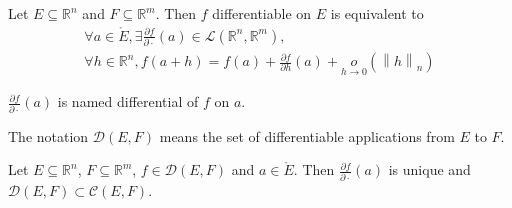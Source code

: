 \documentclass[11pt,en]{elegantpaper}
\newcommand{\norm}[1]{\left\lVert#1\right\rVert}
\newcommand{\Real}{\mathbb{R}}
\begin{document}
\begin{definition}
  Let $E \subseteq \Real^n$ and $F \subseteq \Real^m$.
  Then $f$ differentiable on $E$ is equivalent to \begin{equation}\label{def:differentiable}
    \begin{gathered}
      \forall a \in \mathring{E}, \exists \frac{\partial f}{\partial \cdot}(a) \in \mathcal{L}(\Real^n,\Real^m), \\
      \forall h \in \Real^n, f(a+h) = f(a) + \frac{\partial f}{\partial h}(a) + \underset{h \to 0}o(\norm h _n)
    \end{gathered}
  \end{equation}

  $\frac{\partial f}{\partial \cdot}(a)$ is named differential of $f$ on $a$. \par
  The notation $\mathcal{D}(E,F)$ means the set of differentiable applications from $E$ to $F$.
\end{definition}

\begin{proposition}\label{prop:differential_unique}
  {\normalfont Let $E \subseteq \Real^n$, $F \subseteq \Real^m$, $f \in \mathcal{D}(E,F)$ and $a \in \mathring{E}$.
  Then $\frac{\partial f}{\partial \cdot}(a)$ is unique and $\mathcal{D}(E,F) \subset \mathcal{C}(E,F)$.}
\end{proposition}
\end{document}
